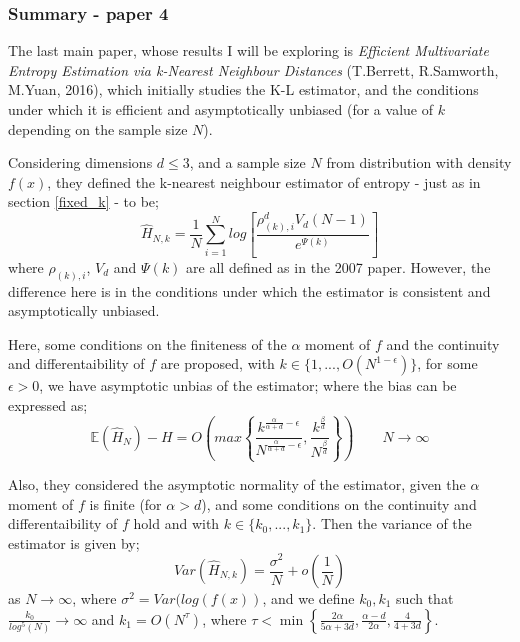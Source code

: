 \documentclass{article}
\begin{document}
\subsubsection{Summary - paper 4}

The last main paper, whose results I will be exploring is \textit{Efficient Multivariate Entropy Estimation via k-Nearest Neighbour Distances} (T.Berrett, R.Samworth, M.Yuan, 2016), which initially studies the K-L estimator, and the conditions under which it is efficient and asymptotically unbiased (for a value of $k$ depending on the sample size $N$). 

Considering dimensions $d \leq 3$, and a sample size $N$ from distribution with density $f(x)$, they defined the k-nearest neighbour estimator of entropy - just as in section \ref{fixed_k} - to be;
\begin{equation}
\hat{H}_{N, k} = \frac{1}{N} \sum_{i=1}^{N} log \left[ \frac{\rho_{(k),i}^{d} V_{d} (N-1)}{e^{\Psi(k)}} \right]
\end{equation}
where $\rho_{(k),i}$, $V_{d}$ and $\Psi(k)$ are all defined as in the 2007 paper. However, the difference here is in the conditions under which the estimator is consistent and asymptotically unbiased.

Here, some conditions on the finiteness of the $\alpha$ moment of $f$ and the continuity and differentaibility of $f$ are proposed, with $k \in \{1, ..., O(N^{1-\epsilon})\}$, for some $\epsilon > 0$, we have asymptotic unbias of the estimator; where the bias can be expressed as;
\begin{equation}
\mathbb{E} ( \hat{H}_{N} ) - H = O \left( max \left\{ \frac{k^{\frac{\alpha}{\alpha + d} - \epsilon}}{N^{\frac{\alpha}{\alpha + d} - \epsilon}}, \frac{k^{\frac{\beta}{d}}}{N^{\frac{\beta}{d}}} \right\} \right) \quad \quad N \to \infty
\end{equation}

Also, they considered the asymptotic normality of the estimator, given the $\alpha$ moment of $f$ is finite (for $\alpha > d$), and some conditions on the continuity and differentaibility of $f$ hold and with $k \in \{k_{0}, ..., k_{1}\}$. Then the variance of the estimator is given by;
\begin{equation}
Var(\hat{H}_{N, k}) = \frac{\sigma^2}{N} + o(\frac{1}{N})
\end{equation}
as $N \to \infty$, where $\sigma^2 = Var(log(f(x))$, and we define $k_{0}, k_{1}$ such that $\frac{k_{0}}{log^5(N)} \to \infty$ and $k_{1} = O(N^{\tau})$, where $\tau < \min \left\{ \frac{2 \alpha}{5 \alpha + 3d} , \frac{\alpha - d}{2 \alpha} , \frac{4}{4 + 3d} \right\}$. 
\end{document}
